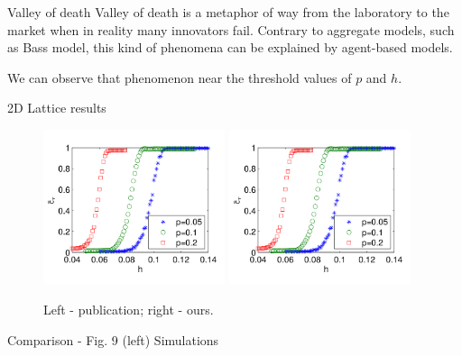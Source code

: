 \documentclass[10pt]{beamer}
\begin{document}
\begin{frame}{Valley of death}
	Valley of death is a metaphor of way from the laboratory to the market when in reality many innovators fail. Contrary to aggregate models, such as Bass model, this kind of phenomena can be explained by agent-based models.
	
	We can observe that phenomenon near the threshold values of $p$ and $h$.
\end{frame}

\begin{frame}{2D Lattice results}
	\begin{figure}
		\includegraphics[width=0.475\textwidth]{../resources/images/fig9-left.png}
		\hfill
		\includegraphics[width=0.475\textwidth]{../resources/images/fig9-left.png}
		\caption{Left - publication; right - ours.}
	\end{figure}
	Comparison - Fig. 9 (left)
	Simulations
\end{frame}
\end{document}
